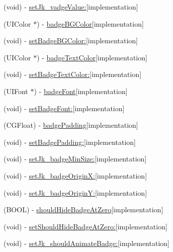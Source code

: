 \begin{DoxyCompactItemize}
(void) -\/ \hyperlink{category_u_i_bar_button_item_07_j_k_badge_08_ab6385571efc3556cf79a1cc9c38d9a22}{set\+Jk\+\_\+vadge\+Value\+:}{\ttfamily  \mbox{[}implementation\mbox{]}}
\item 
(U\+I\+Color $\ast$) -\/ \hyperlink{category_u_i_bar_button_item_07_j_k_badge_08_ae88add47b43c72e9f217a365543c60aa}{badge\+B\+G\+Color}{\ttfamily  \mbox{[}implementation\mbox{]}}
\item 
(void) -\/ \hyperlink{category_u_i_bar_button_item_07_j_k_badge_08_a65f375d62ecec4016b9107fd3ad4a027}{set\+Badge\+B\+G\+Color\+:}{\ttfamily  \mbox{[}implementation\mbox{]}}
\item 
(U\+I\+Color $\ast$) -\/ \hyperlink{category_u_i_bar_button_item_07_j_k_badge_08_a909e87cf522d86d11ba7e37bc8fcc071}{badge\+Text\+Color}{\ttfamily  \mbox{[}implementation\mbox{]}}
\item 
(void) -\/ \hyperlink{category_u_i_bar_button_item_07_j_k_badge_08_a95412296e70ef14a0d5b4ba328de9601}{set\+Badge\+Text\+Color\+:}{\ttfamily  \mbox{[}implementation\mbox{]}}
\item 
(U\+I\+Font $\ast$) -\/ \hyperlink{category_u_i_bar_button_item_07_j_k_badge_08_abb6a97a6c9af42ca0ad9450e4eb8276f}{badge\+Font}{\ttfamily  \mbox{[}implementation\mbox{]}}
\item 
(void) -\/ \hyperlink{category_u_i_bar_button_item_07_j_k_badge_08_a2bf452989d082b87a3f1a2e523e96b31}{set\+Badge\+Font\+:}{\ttfamily  \mbox{[}implementation\mbox{]}}
\item 
(C\+G\+Float) -\/ \hyperlink{category_u_i_bar_button_item_07_j_k_badge_08_a07df16ea956e314b76e4df452b38b0c3}{badge\+Padding}{\ttfamily  \mbox{[}implementation\mbox{]}}
\item 
(void) -\/ \hyperlink{category_u_i_bar_button_item_07_j_k_badge_08_a21f1f4b0ba7a2f4d810607d83f3600b0}{set\+Badge\+Padding\+:}{\ttfamily  \mbox{[}implementation\mbox{]}}
\item 
(void) -\/ \hyperlink{category_u_i_bar_button_item_07_j_k_badge_08_a0b89a3c446f772afc3d16b3333f28888}{set\+Jk\+\_\+badge\+Min\+Size\+:}{\ttfamily  \mbox{[}implementation\mbox{]}}
\item 
(void) -\/ \hyperlink{category_u_i_bar_button_item_07_j_k_badge_08_a407a709dc15803dcc2cbd9ecb312ce8d}{set\+Jk\+\_\+badge\+Origin\+X\+:}{\ttfamily  \mbox{[}implementation\mbox{]}}
\item 
(void) -\/ \hyperlink{category_u_i_bar_button_item_07_j_k_badge_08_a14eb4a83a0a2f967b683946b10e3f0c4}{set\+Jk\+\_\+badge\+Origin\+Y\+:}{\ttfamily  \mbox{[}implementation\mbox{]}}
\item 
(B\+O\+OL) -\/ \hyperlink{category_u_i_bar_button_item_07_j_k_badge_08_a8eb74482955d90aeca8b70404c7407fe}{should\+Hide\+Badge\+At\+Zero}{\ttfamily  \mbox{[}implementation\mbox{]}}
\item 
(void) -\/ \hyperlink{category_u_i_bar_button_item_07_j_k_badge_08_a709eb6a74a1e69c010cb68966de2f4e7}{set\+Should\+Hide\+Badge\+At\+Zero\+:}{\ttfamily  \mbox{[}implementation\mbox{]}}
\item 
(void) -\/ \hyperlink{category_u_i_bar_button_item_07_j_k_badge_08_ab705aea9b1f49fac26c8e29a69864bdf}{set\+Jk\+\_\+should\+Animate\+Badge\+:}{\ttfamily  \mbox{[}implementation\mbox{]}}
\end{DoxyCompactItemize}
